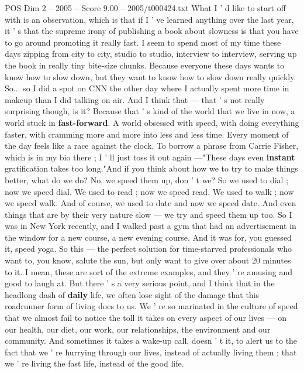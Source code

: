 \begin{textsample}{POS Dim 2 – 2005 – Score 9.00 – 2005/t000424.txt}  \label{ex:f2_pos_024}
What I ' d like to start off with is an observation, which is that if I ' ve learned anything over the last year, it ' s that the supreme irony of publishing a book about slowness is that you have to go around promoting it really fast.
I seem to spend most of my time these days zipping from city to city, studio to studio, interview to interview, serving up the book in really tiny bite-size chunks.
Because everyone these days wants to know how to slow down, but they want to know how to slow down really quickly.
So... so I did a spot on CNN the other day where I actually spent more time in makeup than I did talking on air.
And I think that — that ' s not really surprising though, is it?
Because that ' s kind of the world that we live in now, a world stuck in \textbf{fast-forward}.
A world obsessed with speed, with doing everything faster, with cramming more and more into less and less time.
Every moment of the day feels like a race against the clock.
To borrow a phrase from Carrie Fisher, which is in my bio there ; I ' ll just toss it out again —"These days even \textbf{instant} gratification takes too long."And if you think about how we to try to make things better, what do we do?
No, we speed them up, don ' t we?
So we used to dial ; now we speed dial.
We used to read ; now we speed read.
We used to walk ; now we speed walk.
And of course, we used to date and now we speed date.
And even things that are by their very nature slow — we try and speed them up too.
So I was in New York recently, and I walked past a gym that had an advertisement in the window for a new course, a new evening course.
And it was for, you guessed it, speed yoga.
So this — the perfect solution for time-starved professionals who want to, you know, salute the sun, but only want to give over about 20 minutes to it.
I mean, these are sort of the extreme examples, and they ' re amusing and good to laugh at.
But there ' s a very serious point, and I think that in the headlong dash of \textbf{daily} life, we often lose sight of the damage that this roadrunner form of living does to us.
We ' re so marinated in the culture of speed that we almost fail to notice the toll it takes on every aspect of our lives — on our health, our diet, our work, our relationships, the environment and our community.
And sometimes it takes a wake-up call, doesn ' t it, to alert us to the fact that we ' re hurrying through our lives, instead of actually living them ; that we ' re living the fast life, instead of the good life.

\end{textsample}
